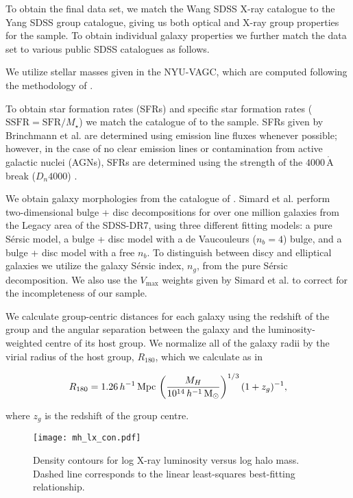 To obtain the final data set, we match the Wang SDSS X-ray catalogue
to the Yang SDSS group catalogue, giving us both optical and X-ray
group properties for the sample.  To obtain individual galaxy
properties we further match the data set to various public SDSS
catalogues as follows.
\par
We utilize stellar masses given in the NYU-VAGC, which are computed
following the methodology of \citet{blanton2007}.
\par
To obtain star formation rates (SFRs) and specific star formation
rates ($\mathrm{SSFR} = \mathrm{SFR} / M_\star$) we match the
catalogue of \citet{brinchmann2004} to the sample.  SFRs given by
Brinchmann et al. are determined using emission line fluxes whenever
possible; however, in the case of no clear emission lines or
contamination from active galactic nuclei (AGNs), SFRs are determined
using the strength of the $4000\,\mathrm{\mathring{A}}$ break
($D_n4000$) \citep{brinchmann2004}.
\par
We obtain galaxy morphologies from the catalogue of
\citet{simard2011}.  Simard et al. perform two-dimensional bulge +
disc decompositions for over one million galaxies from the Legacy area
of the SDSS-DR7, using three different fitting models: a pure
S{\'e}rsic model, a bulge + disc model with a de Vaucouleurs ($n_b =
4$) bulge, and a bulge + disc model with a free $n_b$.  To distinguish
between discy and elliptical galaxies we utilize the galaxy S{\'e}rsic
index, $n_g$, from the pure S{\'e}rsic decomposition.  We also use the
$V_\mathrm{max}$ weights given by Simard et al. to correct for the
incompleteness of our sample.
\par
We calculate group-centric distances for each galaxy using the
redshift of the group and the angular separation between the galaxy
and the luminosity-weighted centre of its host group.  We normalize
all of the galaxy radii by the virial radius of the host group,
$R_{180}$, which we calculate as in \citet{yang2007}

\begin{equation}
  R_{180} =
  1.26\,h^{-1}\,\mathrm{Mpc}\,\left(\frac{M_H}{10^{14}\,h^{-1}\,\mathrm{M_{\odot}}}
  \right )^{1/3} (1 + z_g)^{-1},
\end{equation}

\noindent
where $z_g$ is the redshift of the group centre.

\begin{figure}[!ht]
  \centering
  \texttt{[image: mh\_lx\_con.pdf]}
  \caption{Density contours for log X-ray luminosity versus log halo
    mass.  Dashed line corresponds to the linear least-squares
    best-fitting relationship.}
  \label{fig:mh_lx_con}
\end{figure}

